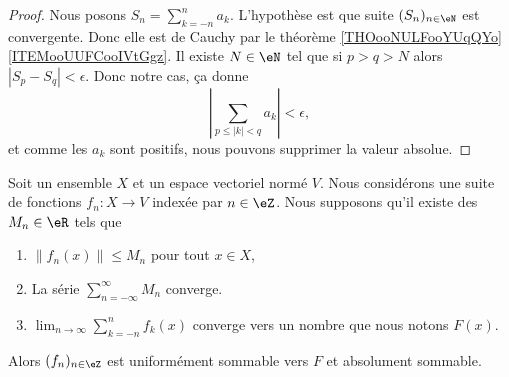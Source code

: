 \begin{proof}
	Nous posons \( S_n=\sum_{k=-n}^na_k\). L'hypothèse est que suite \( (S_n)_{n\in \eN}\) est convergente. Donc elle est de Cauchy par le théorème \ref{THOooNULFooYUqQYo}\ref{ITEMooUUFCooIVtGgz}. Il existe \( N\in \eN\) tel que si \( p>q>N\) alors \( | S_p-S_q |<\epsilon\). Donc notre cas, ça donne
	\begin{equation}
		| \sum_{p\leq | k |<q}a_k |<\epsilon,
	\end{equation}
	et comme les \( a_k\) sont positifs, nous pouvons supprimer la valeur absolue.
\end{proof}



\begin{proposition}	\label{PROPooAMKFooFnjOwI}
	Soit un ensemble \( X\) et un espace vectoriel normé \( V\). Nous considérons une suite de fonctions \(f_n \colon X\to V  \) indexée par \( n\in \eZ\). Nous supposons qu'il existe des \( M_n\in \eR\) tels que
	\begin{enumerate}
		\item		\label{ITEMooTKDBooXiCqaH}
		      \( \| f_n(x) \|\leq M_n\) pour tout \( x\in X\),
		\item		\label{ITEMooVQGCooIuznHD}
		      La série \( \sum_{n=-\infty}^{\infty}M_n\) converge.
		\item
		      \( \lim_{n\to \infty}\sum_{k=-n}^nf_k(x)\) converge vers un nombre que nous notons \( F(x)\).
	\end{enumerate}
	Alors \( (f_n)_{n\in \eZ}\) est uniformément sommable vers \( F\) et absolument sommable.
\end{proposition}

